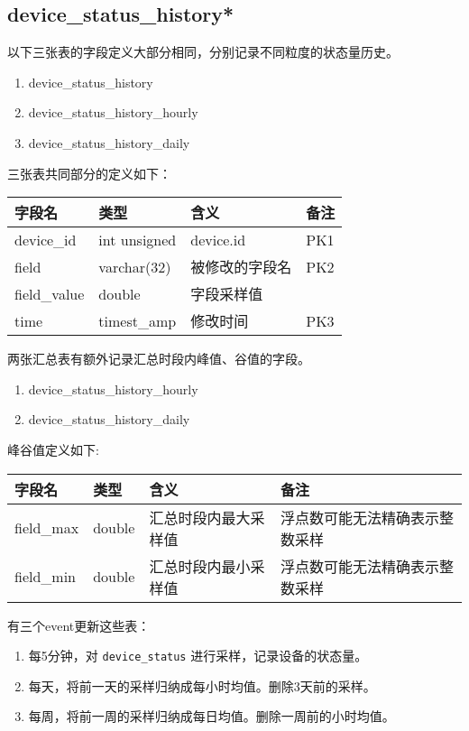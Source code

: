 \subsection{device\_status\_history*}\label{deviceux5fstatusux5fhistory}

以下三张表的字段定义大部分相同，分别记录不同粒度的状态量历史。

\begin{enumerate}
\def\labelenumi{\arabic{enumi}.}
\itemsep1pt\parskip0pt
\item
  device\_status\_history
\item
  device\_status\_history\_hourly
\item
  device\_status\_history\_daily
\end{enumerate}

三张表共同部分的定义如下：

\begin{longtabu}[c]{@{}lXXX@{}}
\toprule
字段名 & 类型 & 含义 & 备注\tabularnewline
\midrule
\endhead
device\_id & int unsigned & device.id & PK1\tabularnewline
field & varchar(32) & 被修改的字段名 & PK2\tabularnewline
field\_value & double & 字段采样值 &\tabularnewline
time & timest\_amp & 修改时间 & PK3\tabularnewline
\bottomrule
\end{longtabu}

两张汇总表有额外记录汇总时段内峰值、谷值的字段。

\begin{enumerate}
\def\labelenumi{\arabic{enumi}.}
\itemsep1pt\parskip0pt
\item
  device\_status\_history\_hourly
\item
  device\_status\_history\_daily
\end{enumerate}

峰谷值定义如下:

\begin{longtabu}[c]{@{}lXXX@{}}
\toprule
字段名 & 类型 & 含义 & 备注\tabularnewline
\midrule
\endhead
field\_max & double & 汇总时段内最大采样值 &
浮点数可能无法精确表示整数采样\tabularnewline
field\_min & double & 汇总时段内最小采样值 &
浮点数可能无法精确表示整数采样\tabularnewline
\bottomrule
\end{longtabu}

有三个event更新这些表：

\begin{enumerate}
\def\labelenumi{\arabic{enumi}.}
\itemsep1pt\parskip0pt
\item
  每5分钟，对 \texttt{device\_status} 进行采样，记录设备的状态量。
\item
  每天，将前一天的采样归纳成每小时均值。删除3天前的采样。
\item
  每周，将前一周的采样归纳成每日均值。删除一周前的小时均值。
\end{enumerate}

